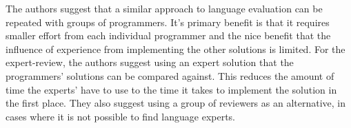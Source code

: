 The authors suggest that a similar approach to language evaluation can be repeated with groups of programmers. It's primary benefit is that it requires smaller effort from each individual programmer and the nice benefit that the influence of experience from implementing the other solutions is limited.
For the expert-review, the authors suggest using an expert solution that the programmers' solutions can be compared against. This reduces the amount of time the experts' have to use to the time it takes to implement the solution in the first place. They also suggest using a group of reviewers as an alternative, in cases where it is not possible to find language experts.